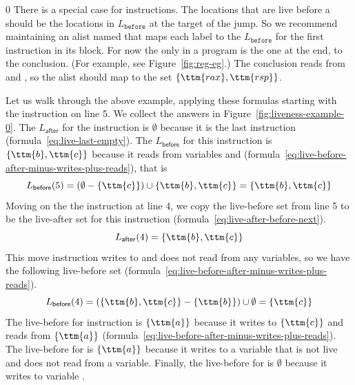 \documentclass[7x10,nocrop]{TimesAPriori_MIT}%
\def\racketEd{0}
\def\edition{1}
\begin{document}
{\if\edition\racketEd
There is a special case for  instructions.  The locations
that are live before a  should be the locations in
$L_{\mathtt{before}}$ at the target of the jump. So we recommend
maintaining an alist named  that maps each label to
the $L_{\mathtt{before}}$ for the first instruction in its block. For
now the only  in a \LangXVar{} program is the one at the
end, to the conclusion. (For example, see Figure~\ref{fig:reg-eg}.)
The conclusion reads from  and , so the alist should
map  to the set $\{\ttm{rax},\ttm{rsp}\}$.
\fi}

Let us walk through the above example, applying these formulas
starting with the instruction on line 5. We collect the answers in
Figure~\ref{fig:liveness-example-0}.  The $L_{\mathsf{after}}$ for the
 instruction is $\emptyset$ because it is the last
instruction (formula~\ref{eq:live-last-empty}).  The
$L_{\mathsf{before}}$ for this instruction is $\{\ttm{b},\ttm{c}\}$
because it reads from variables  and 
(formula~\ref{eq:live-before-after-minus-writes-plus-reads}), that is
\[
   L_{\mathsf{before}}(5) = (\emptyset - \{\ttm{c}\}) \cup \{ \ttm{b}, \ttm{c} \} = \{ \ttm{b}, \ttm{c} \}
\]
Moving on the the instruction  at line 4, we copy
the live-before set from line 5 to be the live-after set for this
instruction (formula~\ref{eq:live-after-before-next}).
\[
  L_{\mathsf{after}}(4) = \{ \ttm{b}, \ttm{c} \}
\]
This move instruction writes to  and does not read from any
variables, so we have the following live-before set
(formula~\ref{eq:live-before-after-minus-writes-plus-reads}).
\[
  L_{\mathsf{before}}(4) = (\{\ttm{b},\ttm{c}\} - \{\ttm{b}\}) \cup \emptyset = \{ \ttm{c} \}
\]
The live-before for instruction 
is $\{\ttm{a}\}$ because it writes to $\{\ttm{c}\}$ and reads from $\{\ttm{a}\}$
(formula~\ref{eq:live-before-after-minus-writes-plus-reads}).  The
live-before for  is $\{\ttm{a}\}$ because it writes to a
variable that is not live and does not read from a variable.
Finally, the live-before for  is $\emptyset$
because it writes to variable .
\end{document}
